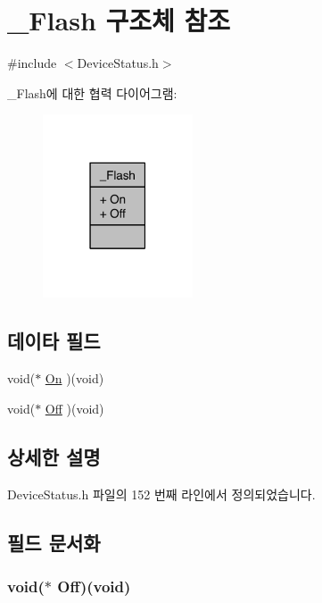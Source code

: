 \hypertarget{struct___flash}{\section{\-\_\-\-Flash 구조체 참조}
\label{struct___flash}
}


{\ttfamily \#include $<$Device\-Status.\-h$>$}



\-\_\-\-Flash에 대한 협력 다이어그램\-:\nopagebreak
\begin{figure}[H]
\begin{center}
\leavevmode
\includegraphics[width=126pt]{d1/d7f/struct___flash__coll__graph}
\end{center}
\end{figure}
\subsection*{데이타 필드}
\begin{DoxyCompactItemize}
\item 
void($\ast$ \hyperlink{struct___flash_af15598d60e5c6b8cace1dce5638b2aab}{On} )(void)
\item 
void($\ast$ \hyperlink{struct___flash_a78a408255e4b030f97997dcc31648b7b}{Off} )(void)
\end{DoxyCompactItemize}


\subsection{상세한 설명}


Device\-Status.\-h 파일의 152 번째 라인에서 정의되었습니다.



\subsection{필드 문서화}
\hypertarget{struct___flash_a78a408255e4b030f97997dcc31648b7b}{
\subsubsection[{Off}]{\setlength{\rightskip}{0pt plus 5cm}void($\ast$  Off)(void)}}\label{struct___flash_a78a408255e4b030f97997dcc31648b7b}


